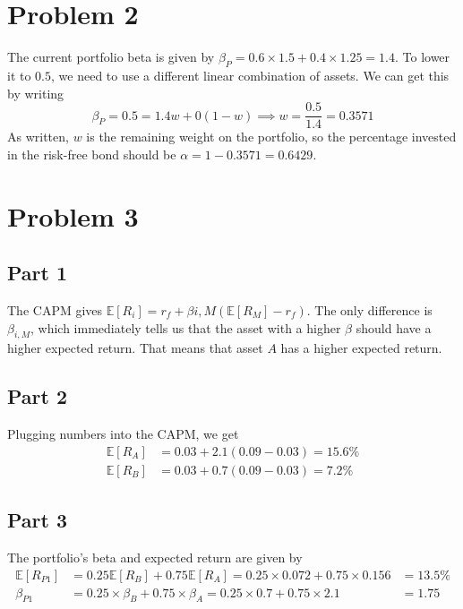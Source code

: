 \documentclass[12pt, letterpaper, parskip = full]{article}
\newcommand{\Ex}[1]{\mathbb{E}\left[#1\right]}
\begin{document}
    \section{Problem 2}

    The current portfolio beta is given by \(\beta_P = 0.6 \times 1.5 + 0.4 \times 1.25 = 1.4\). To lower it to \(0.5\), we need to use a different linear combination of assets. We can get this by writing
    \[ \beta_P = 0.5 = 1.4 w + 0 (1-w) \implies w = \frac{0.5}{1.4} = 0.3571   \]
    As written, \(w\) is the remaining weight on the portfolio, so the percentage invested in the risk-free bond should be \( \boxed{\alpha = 1 - 0.3571 = 0.6429}  \). 

    \section{Problem 3}

    \subsection{Part 1}

    The CAPM gives \( \Ex{R_i} = r_f + \beta{i,M} (\Ex{R_M} - r_f)\). The only difference is \(\beta_{i,M}\), which immediately tells us that the asset with a higher \(\beta\) should have a higher expected return. That means that asset \(A\) has a higher expected return.

    \subsection{Part 2}

    Plugging numbers into the CAPM, we get
    \begin{align*}
        \Ex{R_A} &= 0.03 + 2.1 (0.09 - 0.03) = 15.6\% \\
        \Ex{R_B} &= 0.03 + 0.7 (0.09 - 0.03) = 7.2\%
    \end{align*}

    \subsection{Part 3}
    The portfolio's beta and expected return are given by 
    \begin{align*}
    \Ex{R_{P1}} &= 0.25 \Ex{R_B} + 0.75 \Ex{R_A} = 0.25 \times 0.072 + 0.75 \times 0.156 &= 13.5\% \\
    \beta_{P1} &= 0.25 \times \beta_B + 0.75 \times \beta_A = 0.25 \times 0.7 + 0.75 \times 2.1 &= 1.75
    \end{align*}
\end{document}

